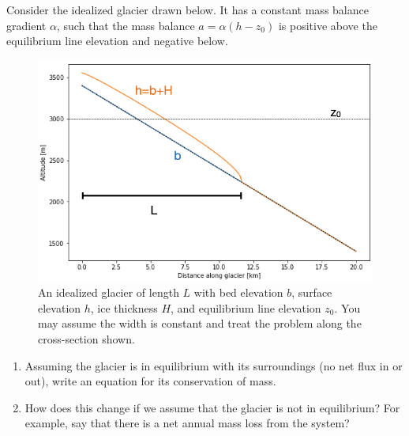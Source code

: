\documentclass[12pt]{article}
\newenvironment{problem}[2][Problem]{\begin{trivlist}
\item[\hskip \labelsep {\bfseries #1}\hskip \labelsep {\bfseries #2.}]}{\end{trivlist}}
\begin{document}
\begin{problem}{4}
[3 pts] Consider the idealized glacier drawn below.  It has a constant mass balance gradient $\alpha$, such that the mass balance $a = \alpha (h-z_0)$ is positive above the equilibrium line elevation and negative below.

\begin{figure}
    \centering
    \includegraphics[width=0.8\linewidth]{figs/PS1-idealized_plot.jpeg}
    \caption{An idealized glacier of length $L$ with bed elevation $b$, surface elevation $h$, ice thickness $H$, and equilibrium line elevation $z_0$.  You may assume the width is constant and treat the problem along the cross-section shown.}
    \label{fig:idealized}
\end{figure}

\renewcommand{\labelenumi}{(\alph{enumi})}
\begin{enumerate}
\setlength\itemsep{0.2em}
    \item  Assuming the glacier is in equilibrium with its surroundings (no net flux in or out), write an equation for its conservation of mass.
    \item How does this change if we assume that the glacier is not in equilibrium?  For example, say that there is a net annual mass loss from the system?
\end{enumerate}

\end{problem}
\end{document}
